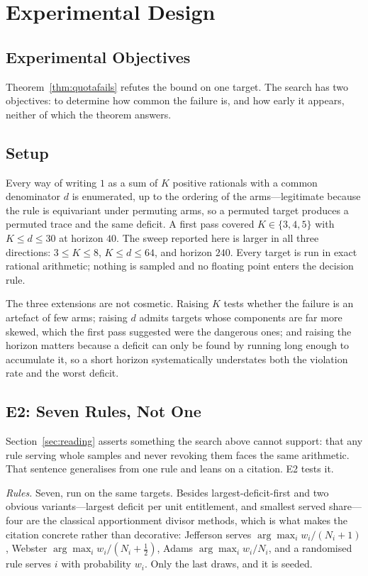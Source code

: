 \documentclass[conference]{IEEEtran}
\theoremstyle{definition}
\begin{document}
\section{Experimental Design}
\label{sec:expdesign}

\subsection{Experimental Objectives}

Theorem~\ref{thm:quotafails} refutes the bound on one target. The search has two objectives:
to determine how common the failure is, and how early it appears, neither of which the theorem
answers.

\subsection{Setup}

Every way of writing $1$ as a sum of $K$ positive rationals with a common denominator $d$ is
enumerated, up to the ordering of the arms---legitimate because the rule is equivariant under
permuting arms, so a permuted target produces a permuted trace and the same deficit. A first
pass covered $K\in\{3,4,5\}$ with $K\le d\le30$ at horizon $40$. The sweep reported here is
larger in all three directions: $3\le K\le8$, $K\le d\le64$, and horizon $240$. Every target
is run in exact rational arithmetic; nothing is sampled and no floating point enters the
decision rule.

The three extensions are not cosmetic. Raising $K$ tests whether the failure is an artefact of
few arms; raising $d$ admits targets whose components are far more skewed, which the first
pass suggested were the dangerous ones; and raising the horizon matters because a deficit can
only be found by running long enough to accumulate it, so a short horizon systematically
understates both the violation rate and the worst deficit.

\subsection{E2: Seven Rules, Not One}
\label{sec:e2}

Section~\ref{sec:reading} asserts something the search above cannot support: that any rule
serving whole samples and never revoking them faces the same arithmetic. That sentence
generalises from one rule and leans on a citation. E2 tests it.

\emph{Rules.} Seven, run on the same targets. Besides largest-deficit-first and two obvious
variants---largest deficit per unit entitlement, and smallest served share---four are the
classical apportionment divisor methods, which is what makes the citation concrete rather
than decorative: Jefferson serves $\arg\max_{i} w_{i}/(N_{i}+1)$, Webster
$\arg\max_{i} w_{i}/(N_{i}+\tfrac12)$, Adams $\arg\max_{i} w_{i}/N_{i}$, and a randomised
rule serves $i$ with probability $w_{i}$. Only the last draws, and it is seeded.
\end{document}
